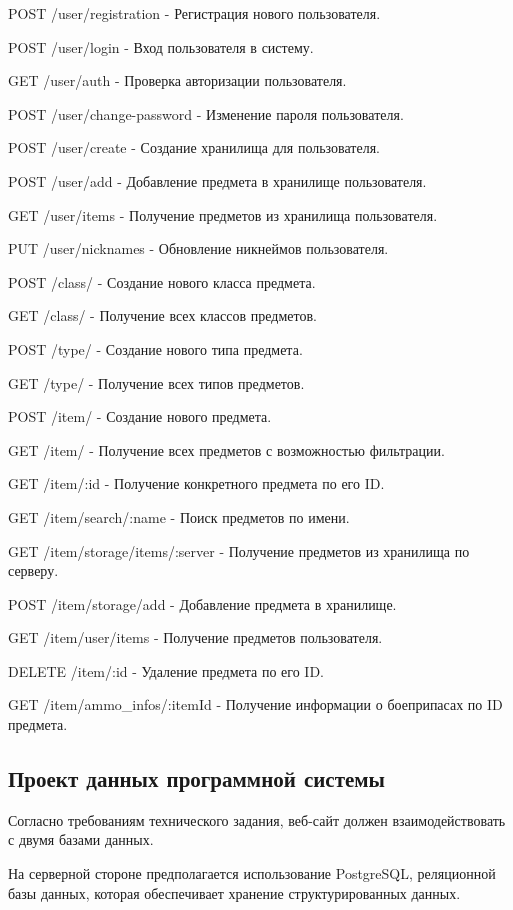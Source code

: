 POST /user/registration - Регистрация нового пользователя.

POST /user/login - Вход пользователя в систему.

GET /user/auth - Проверка авторизации пользователя.

POST /user/change-password - Изменение пароля пользователя.

POST /user/create - Создание хранилища для пользователя.

POST /user/add - Добавление предмета в хранилище пользователя.

GET /user/items - Получение предметов из хранилища пользователя.

PUT /user/nicknames - Обновление никнеймов пользователя.

POST /class/ - Создание нового класса предмета.

GET /class/ - Получение всех классов предметов.

POST /type/ - Создание нового типа предмета.

GET /type/ - Получение всех типов предметов.

POST /item/ - Создание нового предмета.

GET /item/ - Получение всех предметов с возможностью фильтрации.

GET /item/:id - Получение конкретного предмета по его ID.

GET /item/search/:name - Поиск предметов по имени.

GET /item/storage/items/:server - Получение предметов из хранилища по серверу.

POST /item/storage/add - Добавление предмета в хранилище.

GET /item/user/items - Получение предметов пользователя.

DELETE /item/:id - Удаление предмета по его ID.

GET /item/ammo\_infos/:itemId - Получение информации о боеприпасах по ID предмета.

\subsection{Проект данных программной системы}

Согласно требованиям технического задания, веб-сайт должен взаимодействовать с двумя базами данных.

На серверной стороне предполагается использование PostgreSQL, реляционной базы данных, которая обеспечивает хранение структурированных данных.

